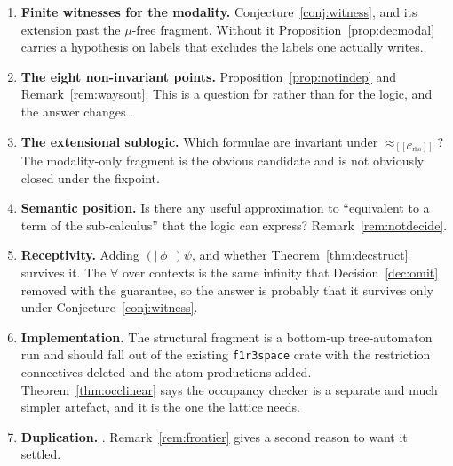 \documentclass[11pt]{article}
\theoremstyle{plain}
\theoremstyle{definition}
\theoremstyle{remark}
\newcommand{\enc}[1]{[\![#1]\!]}
\newcommand{\Ctx}{\mathscr{C}}
\newcommand{\bisim}{\approx}
\newcommand{\rcp}[1]{(\!|\, #1 \,|\!)}
\newcommand{\fix}{\mu}
\begin{document}
\begin{enumerate}[leftmargin=1.8em,itemsep=3pt]

\item \label{open:witness} \textbf{Finite witnesses for the modality.}
Conjecture~\ref{conj:witness}, and its extension past the $\fix$-free fragment.
Without it Proposition~\ref{prop:decmodal} carries a hypothesis on labels that
excludes the labels one actually writes.

\item \label{open:eight} \textbf{The eight non-invariant points.}
Proposition~\ref{prop:notindep} and Remark~\ref{rem:waysout}. This is a question
for \cite{rhocomb3} rather than for the logic, and the answer changes
\cite[Fig.~2]{rhocomb3}.

\item \label{open:extensional} \textbf{The extensional sublogic.} Which formulae
are invariant under $\bisim_{\enc{\Ctx_{\mathrm{rho}}}}$? The modality-only
fragment is the obvious candidate and is not obviously closed under the
fixpoint.

\item \label{open:semantic} \textbf{Semantic position.} Is there any useful
approximation to ``equivalent to a term of the sub-calculus'' that the logic can
express? Remark~\ref{rem:notdecide}.

\item \label{open:recept} \textbf{Receptivity.} Adding $\rcp{\phi}\psi$, and
whether Theorem~\ref{thm:decstruct} survives it. The $\forall$ over contexts is
the same infinity that Decision~\ref{dec:omit} removed with the guarantee, so
the answer is probably that it survives only under
Conjecture~\ref{conj:witness}.

\item \label{open:impl} \textbf{Implementation.} The structural fragment is a
bottom-up tree-automaton run and should fall out of the existing
\texttt{f1r3space} crate \cite{f1r3space} with the restriction connectives
deleted and the atom productions added. Theorem~\ref{thm:occlinear} says the
occupancy checker is a separate and much simpler artefact, and it is the one the
lattice needs.

\item \label{open:conj} \textbf{Duplication.} \cite[Conj.~9.10]{rhocomb3}.
Remark~\ref{rem:frontier} gives a second reason to want it settled.

\end{enumerate}
\end{document}
